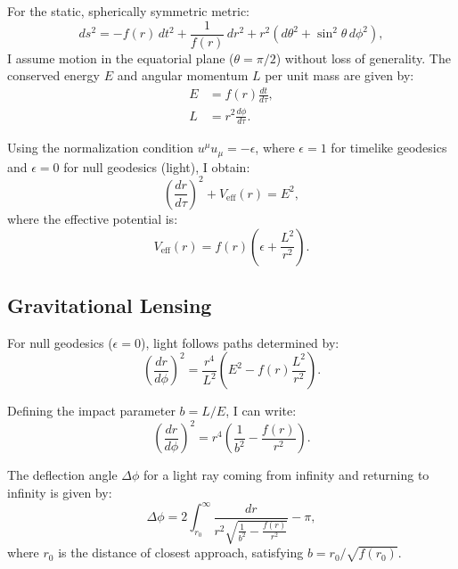 \documentclass[12pt]{article}
\begin{document}
For the static, spherically symmetric metric:
\begin{equation}
ds^2 = -f(r)\, dt^2 + \frac{1}{f(r)}\, dr^2 + r^2 \left( d\theta^2 + \sin^2\theta\, d\phi^2 \right),
\end{equation}
I assume motion in the equatorial plane (\( \theta = \pi/2 \)) without loss of generality. The conserved energy \( E \) and angular momentum \( L \) per unit mass are given by:
\begin{align}
E &= f(r) \frac{dt}{d\tau}, \\
L &= r^2 \frac{d\phi}{d\tau}.
\end{align}

Using the normalization condition \( u^\mu u_\mu = -\epsilon \), where \( \epsilon = 1 \) for timelike geodesics and \( \epsilon = 0 \) for null geodesics (light), I obtain:
\begin{equation}
\left( \frac{dr}{d\tau} \right)^2 + V_{\text{eff}}(r) = E^2,
\end{equation}
where the effective potential is:
\begin{equation}
V_{\text{eff}}(r) = f(r) \left( \epsilon + \frac{L^2}{r^2} \right).
\end{equation}

\subsection{Gravitational Lensing}

For null geodesics (\( \epsilon = 0 \)), light follows paths determined by:
\begin{equation}
\left( \frac{dr}{d\phi} \right)^2 = \frac{r^4}{L^2} \left( E^2 - f(r) \frac{L^2}{r^2} \right).
\end{equation}

Defining the impact parameter \( b = L/E \), I can write:
\begin{equation}
\left( \frac{dr}{d\phi} \right)^2 = r^4 \left( \frac{1}{b^2} - \frac{f(r)}{r^2} \right).
\end{equation}

The deflection angle \( \Delta\phi \) for a light ray coming from infinity and returning to infinity is given by:
\begin{equation}
\Delta\phi = 2 \int_{r_0}^\infty \frac{dr}{r^2 \sqrt{ \frac{1}{b^2} - \frac{f(r)}{r^2} }} - \pi,
\end{equation}
where \( r_0 \) is the distance of closest approach, satisfying \( b = r_0 / \sqrt{f(r_0)} \).
\end{document}
